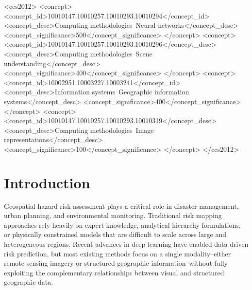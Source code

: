 \documentclass[sigconf, review=true]{acmart}
\begin{document}
%
%
\begin{CCSXML}
<ccs2012>
 <concept>
  <concept_id>10010147.10010257.10010293.10010294</concept_id>
  <concept_desc>Computing methodologies~Neural networks</concept_desc>
  <concept_significance>500</concept_significance>
 </concept>
 <concept>
  <concept_id>10010147.10010257.10010293.10010296</concept_desc>
  <concept_desc>Computing methodologies~Scene understanding</concept_desc>
  <concept_significance>400</concept_significance>
 </concept>
 <concept>
  <concept_id>10002951.10003227.10003241</concept_id>
  <concept_desc>Information systems~Geographic information systems</concept_desc>
  <concept_significance>400</concept_significance>
 </concept>
 <concept>
  <concept_id>10010147.10010257.10010293.10010319</concept_desc>
  <concept_desc>Computing methodologies~Image representations</concept_desc>
  <concept_significance>100</concept_significance>
 </concept>
</ccs2012>
\end{CCSXML}



\maketitle

\section{Introduction}

Geospatial hazard risk assessment plays a critical role in disaster management, urban planning, and environmental monitoring. Traditional risk mapping approaches rely heavily on expert knowledge, analytical hierarchy formulations, or physically constrained models that are difficult to scale across large and heterogeneous regions. Recent advances in deep learning have enabled data-driven risk prediction, but most existing methods focus on a single modality--either remote sensing imagery or structured geographic information--without fully exploiting the complementary relationships between visual and structured geographic data.
\end{document}
